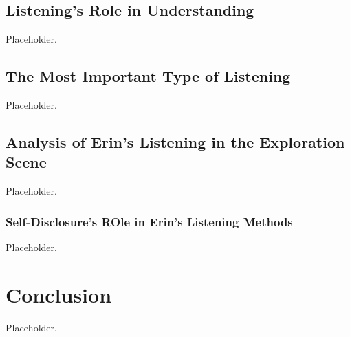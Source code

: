 \documentclass[stu,12pt]{apa7}
\begin{document}
    \subsection{Listening's Role in Understanding}
      Placeholder.

    \subsection{The Most Important Type of Listening}
      Placeholder.

    \subsection{Analysis of Erin's Listening in the Exploration Scene}
      Placeholder.

      \subsubsection{Self-Disclosure's ROle in Erin's Listening Methods}
      Placeholder.


  \section{Conclusion}
    Placeholder.




  \newpage
  \nocite{*}
  \printbibliography[%
    title={Additional References},%
    heading={bibintoc},%
    category={consulted}%
  ]
\end{document}
